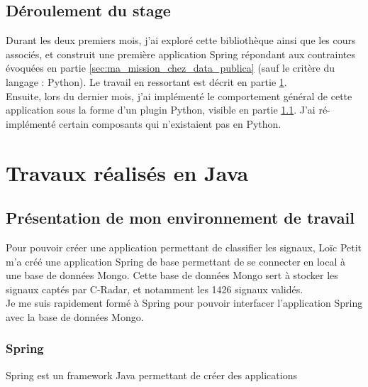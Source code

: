     \subsection{Déroulement du stage}
        Durant les deux premiers mois, j'ai exploré cette bibliothèque ainsi que les cours associés, et construit une première application Spring répondant aux contraintes évoquées en partie \ref{sec:ma_mission_chez_data_publica} (sauf le critère du langage : Python). Le travail en ressortant est décrit en partie \ref{sec:travaux_realises_en_java}.\\

        Ensuite, lors du dernier mois, j’ai implémenté le comportement général de cette application sous la forme d’un plugin Python, visible en partie \ref{}. J'ai ré-implémenté certain composants qui n'existaient pas en Python.

\section{Travaux réalisés en Java}
\label{sec:travaux_realises_en_java}
    \subsection{Présentation de mon environnement de travail}
        Pour pouvoir créer une application permettant de classifier les signaux, Loïc Petit m'a créé une application Spring de base permettant de se connecter en local à une base de données Mongo. Cette base de données Mongo sert à stocker les signaux captés par C-Radar, et notamment les 1426 signaux validés.\\
        Je me suis rapidement formé à Spring pour pouvoir interfacer l'application Spring avec la base de données Mongo.\\

        \subsubsection{Spring} %
        \label{ssub:spring}
            Spring est un framework Java permettant de créer des applications

